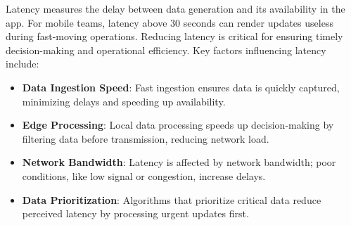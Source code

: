         Latency measures the delay between data generation and its availability in the app. For mobile teams, latency above 30 seconds can render updates useless during fast-moving operations. Reducing latency is critical for ensuring timely decision-making and operational efficiency. Key factors influencing latency include: 

        \begin{itemize} 
            \item \textbf{Data Ingestion Speed}: Fast ingestion ensures data is quickly captured, minimizing delays and speeding up availability.
            \item \textbf{Edge Processing}: Local data processing speeds up decision-making by filtering data before transmission, reducing network load.
            \item \textbf{Network Bandwidth}: Latency is affected by network bandwidth; poor conditions, like low signal or congestion, increase delays.
            \item \textbf{Data Prioritization}: Algorithms that prioritize critical data reduce perceived latency by processing urgent updates first.

        \end{itemize}
        \autocite{GeeksforGeeks2024Oct}

\blankLine

